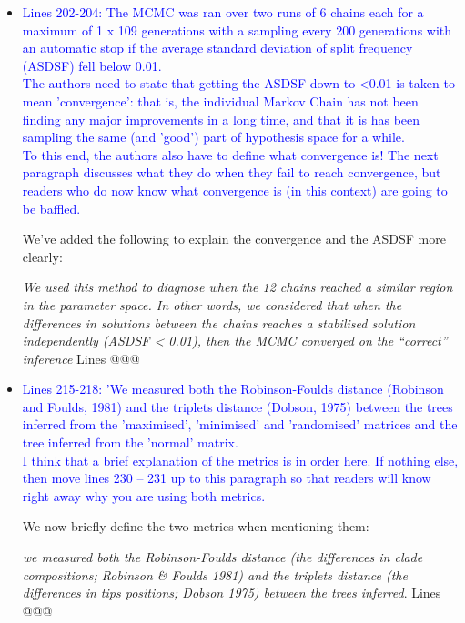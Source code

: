 \documentclass[12pt,letterpaper]{article}
\begin{document}
\begin{itemize}
\item{\textcolor{blue}{Lines 202-204: The MCMC was ran over two runs of 6 chains each for a maximum of 1 x 109 generations with a sampling every 200 generations with an automatic stop if the average standard deviation of split frequency (ASDSF) fell below 0.01.
\\
The authors need to state that getting the ASDSF down to <0.01 is taken to mean 'convergence': that is, the individual Markov Chain has not been finding any major improvements in a long time, and that it is has been sampling the same (and 'good') part of hypothesis space for a while.
\\
To this end, the authors also have to define what convergence is! The next paragraph discusses what they do when they fail to reach convergence, but readers who do now know what convergence is (in this context) are going to be baffled.}}

We've added the following to explain the convergence and the ASDSF more clearly:

\textit{We used this method to diagnose when the 12 chains reached a similar region in the parameter space. In other words, we considered that when the differences in solutions between the chains reaches a stabilised solution independently (ASDSF < 0.01), then the MCMC converged on the “correct” inference} Lines @@@



\item{\textcolor{blue}{Lines 215-218: 'We measured both the Robinson-Foulds distance (Robinson and Foulds, 1981) and the triplets distance (Dobson, 1975) between the trees inferred from the 'maximised', 'minimised' and 'randomised' matrices and the tree inferred from the 'normal' matrix.
\\
I think that a brief explanation of the metrics is in order here. If nothing else, then move lines 230 – 231 up to this paragraph so that readers will know right away why you are using both metrics.}}

We now briefly define the two metrics when mentioning them:

\textit{we measured both the Robinson-Foulds distance (the differences in clade compositions; Robinson \& Foulds 1981) and the triplets distance (the differences in tips positions; Dobson 1975) between the trees inferred}. Lines @@@

\end{itemize}
\end{document}
